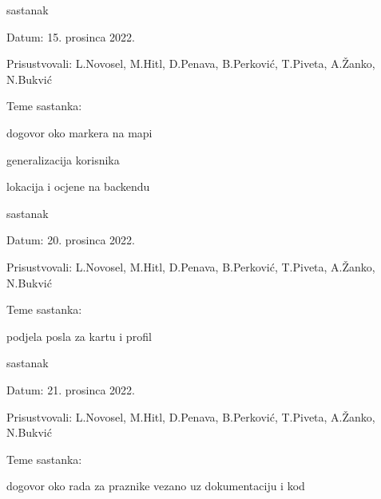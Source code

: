 \begin{packed_enum}
             \item  sastanak
           			\item[] \begin{packed_item}
    				\item Datum: 15. prosinca 2022.
    				\item Prisustvovali: L.Novosel, M.Hitl, D.Penava, B.Perković, T.Piveta, A.Žanko, N.Bukvić
    				\item Teme sastanka:
    				\begin{packed_item}
    				    \item  dogovor oko markera na mapi
                		\item  generalizacija korisnika
    				    \item  lokacija i ocjene na backendu
    				\end{packed_item}
            			\end{packed_item}


             \item  sastanak
           			\item[] \begin{packed_item}
    				\item Datum: 20. prosinca 2022.
    				\item Prisustvovali: L.Novosel, M.Hitl, D.Penava, B.Perković, T.Piveta, A.Žanko, N.Bukvić
    				\item Teme sastanka:
    				\begin{packed_item}
    				    \item  podjela posla za kartu i profil
    				\end{packed_item}
            			\end{packed_item}

             \item  sastanak
           			\item[] \begin{packed_item}
    				\item Datum: 21. prosinca 2022.
    				\item Prisustvovali: L.Novosel, M.Hitl, D.Penava, B.Perković, T.Piveta, A.Žanko, N.Bukvić
    				\item Teme sastanka:
    				\begin{packed_item}
    				    \item  dogovor oko rada za praznike vezano uz dokumentaciju i kod
    				\end{packed_item}
            			\end{packed_item}


\end{packed_enum}

